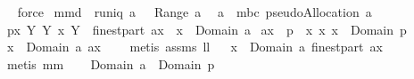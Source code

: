 \begin{isabellebody}
\isadelimproof
\ %
\endisadelimproof
%
\isatagproof
{}\isamarkupfalse%
\ force%
\endisatagproof
{\isafoldproof}%
%
\isadelimproof
%
\endisadelimproof
\isanewline
{}\isamarkupfalse%
\ mm{}{}d{\isacharcolon}\ \ {\isachardoublequoteopen}runiq\ a{\isachardoublequoteclose}\ {\isachardoublequoteopen}{\isacharbraceleft}{\isacharbraceright}\ {\isasymnotin}\ Range\ a{\isachardoublequoteclose}\ \ \isanewline
{\isachardoublequoteopen}a\ {\isacharequal}\ mbc\ {\isacharparenleft}pseudoAllocation\ a{\isacharparenright}{\isachardoublequoteclose}\isanewline
%
\isadelimproof
%
\endisadelimproof
%
\isatagproof
{}\isamarkupfalse%
\ {\isacharminus}\isanewline
{}\isamarkupfalse%
\ {\isacharquery}p{\isacharequal}{\isachardoublequoteopen}{\isacharbraceleft}{\isacharparenleft}x{\isacharcomma}\ Y{\isacharparenright}{\isacharbar}\ Y\ x{\isachardot}\ Y\ {\isasymin}\ finestpart\ {\isacharparenleft}a{\isacharcomma}{\isacharcomma}x{\isacharparenright}\ {\isacharampersand}\ x\ {\isasymin}\ Domain\ a{\isacharbraceright}{\isachardoublequoteclose}\isanewline
{}\isamarkupfalse%
\ {\isacharquery}a{\isacharequal}{\isachardoublequoteopen}{\isacharbraceleft}{\isacharparenleft}x{\isacharcomma}\ {\isasymUnion}\ {\isacharparenleft}{\isacharquery}p\ {\isacharbackquote}{\isacharbackquote}\ {\isacharbraceleft}x{\isacharbraceright}{\isacharparenright}{\isacharparenright}{\isacharbar}\ x{\isachardot}\ x\ {\isasymin}\ Domain\ {\isacharquery}p{\isacharbraceright}{\isachardoublequoteclose}\ \isanewline
{}\isamarkupfalse%
\ {\isachardoublequoteopen}{\isasymforall}x\ {\isasymin}\ Domain\ a{\isachardot}\ a{\isacharcomma}{\isacharcomma}x\ {\isasymnoteq}\ {\isacharbraceleft}{\isacharbraceright}{\isachardoublequoteclose}\ \isamarkupfalse%
\ {\isacharparenleft}metis\ assms\ ll{}{}{\isacharparenright}\isanewline
{}\isamarkupfalse%
\ \isamarkupfalse%
\ {\isachardoublequoteopen}{\isasymforall}x\ {\isasymin}\ Domain\ a{\isachardot}\ finestpart\ {\isacharparenleft}a{\isacharcomma}{\isacharcomma}x{\isacharparenright}\ {\isasymnoteq}\ {\isacharbraceleft}{\isacharbraceright}{\isachardoublequoteclose}\ \isamarkupfalse%
\ {\isacharparenleft}metis\ mm{}{}{\isacharparenright}\ \isanewline
{}\isamarkupfalse%
\ \isamarkupfalse%
\ {\isachardoublequoteopen}Domain\ a\ {\isasymsubseteq}\ Domain\ {\isacharquery}p{\isachardoublequoteclose}\ \isamarkupfalse%

\end{isabellebody}
